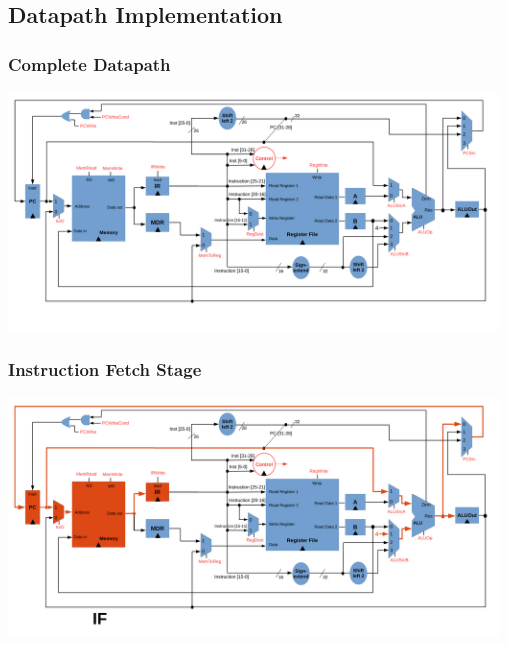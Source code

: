 \documentclass{beamer}
\begin{document}
\subsection{Datapath Implementation}

\begin{frame}%
\frametitle{Complete Datapath}

\begin{center}
\hspace*{-1cm}\includegraphics[width=13cm]{complete_multi_cycle.pdf}
\end{center}

\end{frame}

\begin{frame}%
\frametitle{Instruction Fetch Stage}

\begin{center}
\hspace*{-1cm}\includegraphics[width=13cm]{complete_multi_cycle_stage1.pdf}
\end{center}

\end{frame}
\end{document}
